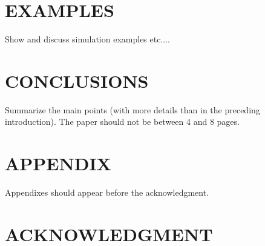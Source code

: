 \documentclass[letterpaper, 10 pt, conference]{ieeeconf}  %
\begin{document}
\section{EXAMPLES}\label{examples}

Show and discuss simulation examples etc....



\section{CONCLUSIONS}

Summarize the main points (with more details than in the preceding introduction).
The paper should not be between 4 and 8 pages.



\addtolength{\textheight}{-12cm}   %



\section*{APPENDIX}

Appendixes should appear before the acknowledgment.

\section*{ACKNOWLEDGMENT}






\end{document}
